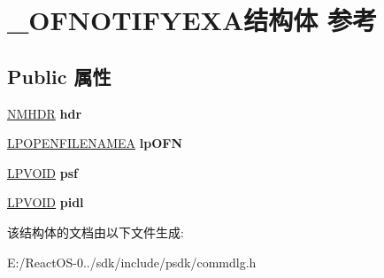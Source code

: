 \hypertarget{struct___o_f_n_o_t_i_f_y_e_x_a}{}\section{\+\_\+\+O\+F\+N\+O\+T\+I\+F\+Y\+E\+X\+A结构体 参考}
\label{struct___o_f_n_o_t_i_f_y_e_x_a}
\subsection*{Public 属性}
\begin{DoxyCompactItemize}
\item 
\mbox{\label{struct___o_f_n_o_t_i_f_y_e_x_a_a4ecbc10f35ee55eb01d7dcfe42560290}} 
\hyperlink{structtag_n_m_h_d_r}{N\+M\+H\+DR} {\bfseries hdr}
\item 
\mbox{\label{struct___o_f_n_o_t_i_f_y_e_x_a_a778059808d7693eac39e91ae51d6307d}} 
\hyperlink{structtag_o_f_n_a}{L\+P\+O\+P\+E\+N\+F\+I\+L\+E\+N\+A\+M\+EA} {\bfseries lp\+O\+FN}
\item 
\mbox{\label{struct___o_f_n_o_t_i_f_y_e_x_a_a2ad3d30e01837fdab60228e79b007f42}} 
\hyperlink{interfacevoid}{L\+P\+V\+O\+ID} {\bfseries psf}
\item 
\mbox{\label{struct___o_f_n_o_t_i_f_y_e_x_a_a5abedc9fae5956801610d4a356b914d9}} 
\hyperlink{interfacevoid}{L\+P\+V\+O\+ID} {\bfseries pidl}
\end{DoxyCompactItemize}


该结构体的文档由以下文件生成\+:\begin{DoxyCompactItemize}
\item 
E\+:/\+React\+O\+S-\/0../sdk/include/psdk/commdlg.\+h\end{DoxyCompactItemize}
